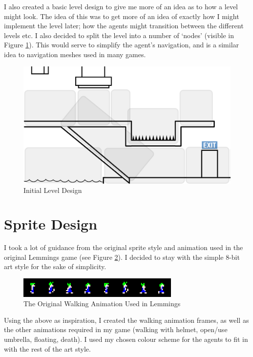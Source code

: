 \documentclass[a4paper,oneside]{report}
\begin{document}
I also created a basic level design to give me more of an idea as to how a level might look. The idea of this was to get more of an idea of exactly how I might implement the level later; how the agents might transition between the different levels etc. I also decided to split the level into a number of `nodes' (visible in Figure \ref{fig:LevelDesign}). This would serve to simplify the agent's navigation, and is a similar idea to navigation meshes used in many games.  

\begin{figure}[h!]
  \centering
    \includegraphics[width=120mm]{sources/images/LevelDesign}
    \caption{Initial Level Design}
    \label{fig:LevelDesign}
\end{figure}
	
\section{Sprite Design}
		
I took a lot of guidance from the original sprite style and animation used in the original Lemmings game (see Figure \ref{fig:LemmingWalkerSprites}). I decided to stay with the simple 8-bit art style for the sake of simplicity.
	
\begin{figure}[h!]
  \centering
    \includegraphics[width=80mm]{sources/images/lemmings-walker-sprites}
    \caption{The Original Walking Animation Used in Lemmings \cite{Marsh:vn}}
    \label{fig:LemmingWalkerSprites}
\end{figure}
		
Using the above as inspiration, I created the walking animation frames, as well as the other animations required in my game (walking with helmet, open/use umbrella, floating, death). I used my chosen colour scheme for the agents to fit in with the rest of the art style.
		
\end{document}

